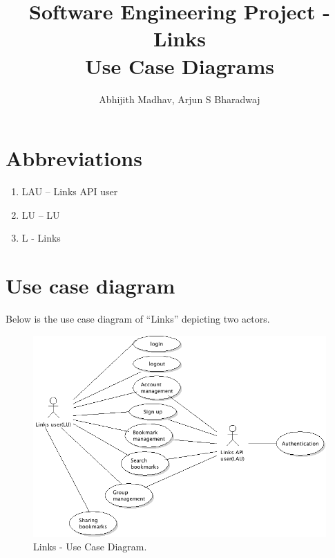 \documentclass[11pt]{report} %
\title{Software Engineering Project - Links \\Use Case Diagrams}
\author{Abhijith Madhav, Arjun S Bharadwaj}
\begin{document}
\maketitle
\section*{Abbreviations}
\begin{enumerate}
	\item
		LAU – Links API user
	\item
		LU – LU
	\item
		L - Links
\end{enumerate}

\maketitle
\section*{Use case diagram}
Below is the use case diagram of “Links” depicting two actors.
\begin{figure}[h]
\centering
        \includegraphics[width=\textwidth]{usecase}
    \caption{{Links - Use Case Diagram}.}
    \label{fig:Use Case Diagram}
\end{figure}


\maketitle
\end{document}
